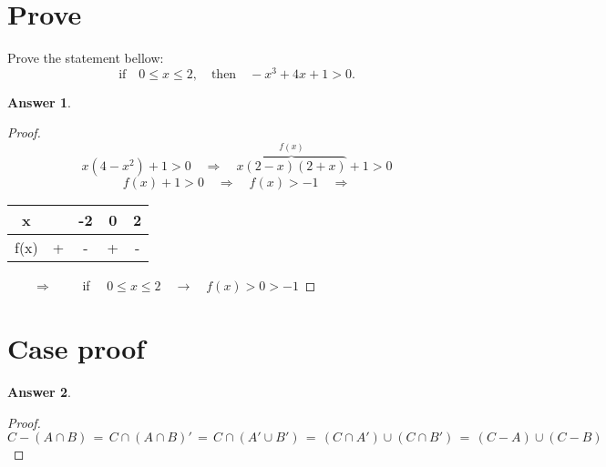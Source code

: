 \documentclass{article}
\renewcommand{\(}{\left(}
\renewcommand{\)}{\right)}
\theoremstyle{plain}
\theoremstyle{plain}
\theoremstyle{definition}
\newtheorem*{answer}{Answer}
\begin{document}
\section{Prove }
Prove the statement bellow:
$$ \text{if} \quad 0 \leq x \leq 2, \quad \text{then} \quad -x^3 + 4x + 1 > 0. $$
\begin{shaded}
\begin{answer}
\begin{proof}
$$ x(4 - x^2) + 1 > 0 \quad \Rightarrow \quad \overbrace{x(2-x)(2+x)}^{f(x)} + 1 > 0 $$
$$ f(x) + 1 > 0 \quad \Rightarrow \quad f(x) > -1 \quad \Rightarrow $$
\begin{tabular}{ccccc}

  x  &\vline  &-2  &0  &2 \\
  \hline
  f(x)   &\vline \quad + &\vline \quad - &\vline \quad +  & \vline \quad  - \\

\end{tabular}
 $ \qquad \Rightarrow \qquad $ if $ \quad 0 \leq x \leq 2 \quad \rightarrow \quad f(x) > 0 > -1 $
\end{proof}
\end{answer}
\end{shaded}

\section{Case proof}

\begin{shaded}
\begin{answer}
\begin{proof}
  $$ C - (A\cap B)  \, = \, C \cap (A \cap B)' \, = \, C \cap ( A' \cup B' ) \,
  = \, (C \cap A' ) \cup (C \cap B' ) \, = \, ( C - A ) \cup ( C - B )  $$
\end{proof}
\end{answer}
\end{shaded}
\end{document}
